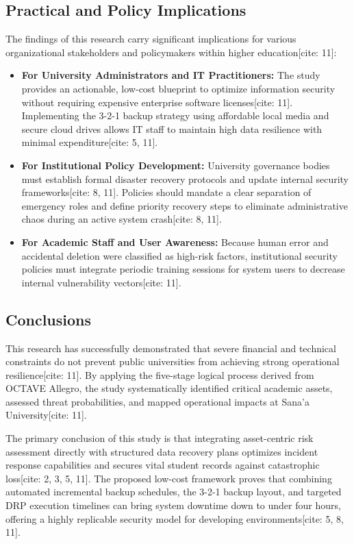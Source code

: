 \documentclass[journal,onecolumn,12pt,twoside]{IEEEtran}
\begin{document}
	\subsection{Practical and Policy Implications}
	\label{subsec:implications}
	The findings of this research carry significant implications for various organizational stakeholders and policymakers within higher education[cite: 11]:
	\begin{itemize}
		\item \textbf{For University Administrators and IT Practitioners:} The study provides an actionable, low-cost blueprint to optimize information security without requiring expensive enterprise software licenses[cite: 11]. Implementing the 3-2-1 backup strategy using affordable local media and secure cloud drives allows IT staff to maintain high data resilience with minimal expenditure[cite: 5, 11].
		\item \textbf{For Institutional Policy Development:} University governance bodies must establish formal disaster recovery protocols and update internal security frameworks[cite: 8, 11]. Policies should mandate a clear separation of emergency roles and define priority recovery steps to eliminate administrative chaos during an active system crash[cite: 8, 11].
		\item \textbf{For Academic Staff and User Awareness:} Because human error and accidental deletion were classified as high-risk factors, institutional security policies must integrate periodic training sessions for system users to decrease internal vulnerability vectors[cite: 11].
	\end{itemize}
	
	\subsection{Conclusions}
	\label{subsec:conclusions}
	This research has successfully demonstrated that severe financial and technical constraints do not prevent public universities from achieving strong operational resilience[cite: 11]. By applying the five-stage logical process derived from OCTAVE Allegro, the study systematically identified critical academic assets, assessed threat probabilities, and mapped operational impacts at Sana'a University[cite: 11]. 
	
	The primary conclusion of this study is that integrating asset-centric risk assessment directly with structured data recovery plans optimizes incident response capabilities and secures vital student records against catastrophic loss[cite: 2, 3, 5, 11]. The proposed low-cost framework proves that combining automated incremental backup schedules, the 3-2-1 backup layout, and targeted DRP execution timelines can bring system downtime down to under four hours, offering a highly replicable security model for developing environments[cite: 5, 8, 11].
	
\end{document}
